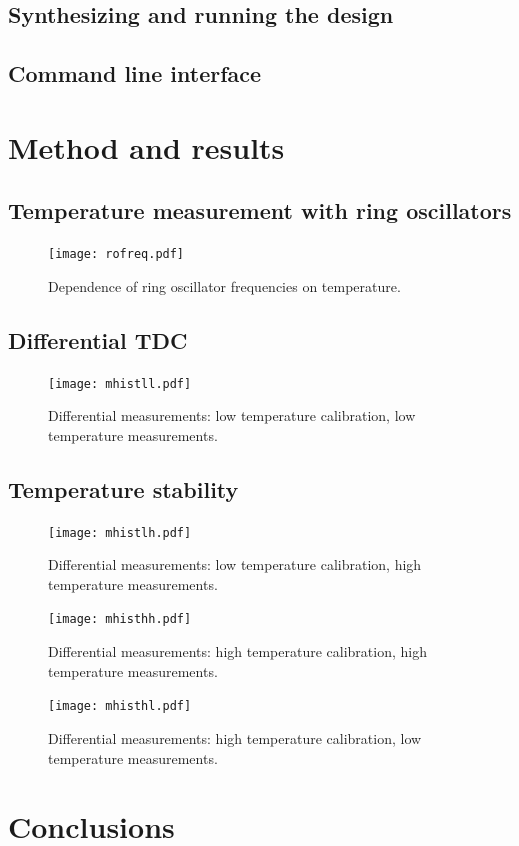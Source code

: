 \documentclass[a4paper,11pt]{article}
\begin{document}
\subsection{Synthesizing and running the design}

\subsection{Command line interface}

\section{Method and results}

\subsection{Temperature measurement with ring oscillators}

\begin{figure}[h]
\texttt{[image: rofreq.pdf]}
\caption{Dependence of ring oscillator frequencies on temperature.}
\label{fig:rofreq}
\end{figure}

\subsection{Differential TDC}

\begin{figure}[h]
\texttt{[image: mhistll.pdf]}
\caption{Differential measurements: low temperature calibration, low temperature measurements.}
\label{fig:mhistll}
\end{figure}

\subsection{Temperature stability}

\begin{figure}[h]
\texttt{[image: mhistlh.pdf]}
\caption{Differential measurements: low temperature calibration, high temperature measurements.}
\label{fig:mhistlh}
\end{figure}

\begin{figure}[h]
\texttt{[image: mhisthh.pdf]}
\caption{Differential measurements: high temperature calibration, high temperature measurements.}
\label{fig:mhisthh}
\end{figure}

\begin{figure}[h]
\texttt{[image: mhisthl.pdf]}
\caption{Differential measurements: high temperature calibration, low temperature measurements.}
\label{fig:mhisthl}
\end{figure}

\section{Conclusions}
\end{document}
